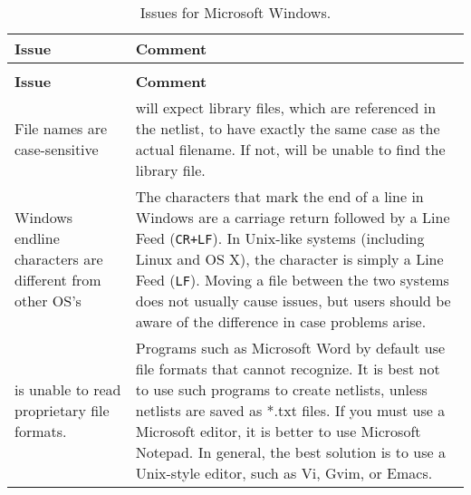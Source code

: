 



\label{Windows_Issues}
\begin{longtable}[h] {>{\raggedright\small}m{2in}|>{\raggedright\let\\\tabularnewline\small}m{4in}}
  \caption{Issues for Microsoft Windows.} \\ \hline
  \rowcolor{XyceDarkBlue}
  \color{white}\bf Issue &
  \color{white}\bf Comment \\ \hline \endfirsthead
  \caption[]{Issues for Microsoft Windows.} \\ \hline
  \rowcolor{XyceDarkBlue}
  \color{white}\bf Issue &
  \color{white}\bf Comment \\ \hline \endhead

File names are case-sensitive &
\Xyce{} will expect library files, which are referenced in the netlist, to have
exactly the same case as the actual filename.  If not, \Xyce{} will be unable
to find the library file.  \\ \hline

Windows endline characters are different from other OS's &
The characters that mark the end of a line in Windows are a carriage return
followed by a Line Feed (\texttt{CR+LF}).  In Unix-like systems (including
Linux and OS X), the character is simply a Line Feed (\texttt{LF}).  Moving a
file between the two systems does not usually cause issues, but users should be
aware of the difference in case problems arise.  \\ \hline

\Xyce{} is unable to read proprietary file formats. &
Programs such as Microsoft Word by default use file formats that \Xyce{} cannot
recognize.  It is best not to use such programs to create netlists, unless
netlists are saved as *.txt files.   If you must use a Microsoft editor, it is
better to use Microsoft Notepad.  In general, the best solution is to use a
Unix-style editor, such as Vi, Gvim, or Emacs.  \\ \hline

\end{longtable}


